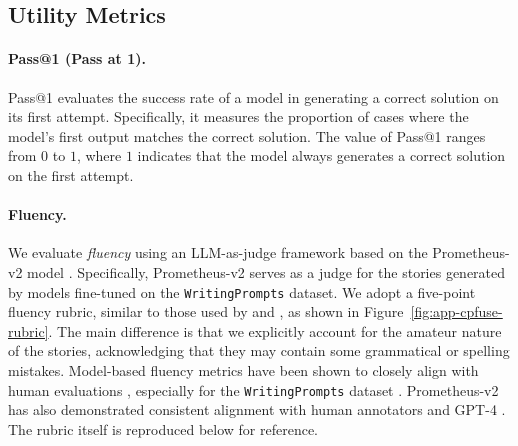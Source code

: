 \subsection{Utility Metrics}
\label{app:cpfuse-reference-metrics-utility}

\paragraph{Pass@1 (Pass at 1).}
Pass@1 evaluates the success rate of a model in generating a correct solution on its first attempt. Specifically, it measures the proportion of cases where the model's first output matches the correct solution. The value of Pass@1 ranges from \(0\) to \(1\), where \(1\) indicates that the model always generates a correct solution on the first attempt.

\paragraph{Fluency.}
We evaluate \textit{fluency} using an LLM-as-judge framework \citep{zheng2024judging} based on the Prometheus-v2 model \citep{kim2024prometheus}. Specifically, Prometheus-v2 serves as a judge for the stories generated by models fine-tuned on the \texttt{WritingPrompts} dataset. We adopt a five-point fluency rubric, similar to those used by \citet{fu2023gptscore} and \citet{chen2024copybench}, as shown in Figure~\ref{fig:app-cpfuse-rubric}. The main difference is that we explicitly account for the amateur nature of the stories, acknowledging that they may contain some grammatical or spelling mistakes. Model-based fluency metrics have been shown to closely align with human evaluations \citep{liu2023g, sottana2023evaluation}, especially for the \texttt{WritingPrompts} dataset \citep{chiang2023can}. Prometheus-v2 has also demonstrated consistent alignment with human annotators and GPT-4 \citep{kim2024prometheus}. The rubric itself is reproduced below for reference.

